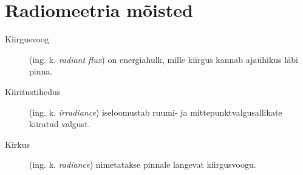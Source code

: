 \documentclass[a4paper,12pt]{report}
\begin{document}
\renewcommand\bibname{Kasutatud materjalid}



\appendix
\chapter{Radiomeetria mõisted}
\begin{description}
\item[Kiirgusvoog] (ing. k. \textit{radiant flux}) on energiahulk, mille kiirgus kannab ajaühikus läbi pinna.
\item[Kiiritustihedus] (ing. k. \textit{irradiance}) iseloomustab ruumi- ja mittepunktvalgusallikate kiiratud valgust.
\item[Kirkus] (ing. k. \textit{radiance}) nimetatakse pinnale langevat kiirgusvoogu.
\end{description}
\end{document}
